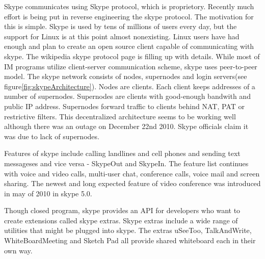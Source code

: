Skype communicates using Skype protocol, which is proprietory. Recently much effort is being put in reverse engineering the skype protocol. The motivation for this is simple. Skype is used by tens of millions of users every day, but the support for Linux is at this point almost nonexisting. Linux users have had enough and plan to create an open source client capable of communicating with skype. The wikipedia skype protocol page\cite{wikipediaSkypeProtocol} is filling up with details. While most of IM programs utilize client-server communication scheme, skype uses peer-to-peer model. The skype network consists of nodes, supernodes and login servers(see figure\ref{fig:skypeArchitecture}). Nodes are clients. Each client keeps addresses of a number of supernodes. Supernodes are clients with good-enough bandwith and public IP address. Supernodes forward traffic to clients behind NAT, PAT or restrictive filters. This decentralized architecture seems to be working well although there was an outage on December 22nd 2010. Skype officials claim it was due to lack of supernodes\cite{skypeOutage}.  

Features of skype include calling landlines and cell phones and sending text messageses and vice versa - SkypeOut and SkypeIn. The feature list continues with voice and video calls, multi-user chat, conference calls, voice mail and screen sharing. The newest and long expected feature of video conference was introduced in may of 2010 in skype 5.0. 

Though closed program, skype provides an API for developers who want to create extensions called skype extras. Skype extras include a wide range of utilities that might be plugged into skype. The extras uSeeToo, TalkAndWrite, WhiteBoardMeeting and Sketch Pad all provide shared whiteboard each in their own way.    

% 


